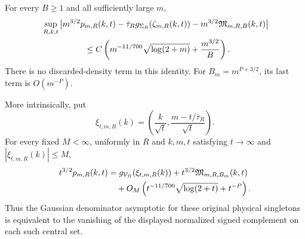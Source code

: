 \begin{theorem}
\label{thm:physical-singleton-reduction}
For every $B\ge1$ and all sufficiently large $m$,
\begin{align}
 &\sup_{R,k,t}\big|m^{3/2}p_{m,R}(k,t)
  -\bar\tau_Rg_{\Sigma_R}(\zeta_{m,R}(k,t))
  -m^{3/2}\mathfrak M_{m,R,B}(k,t)\big|\notag\\
 &\hspace{18mm}\le C\left(m^{-11/700}\sqrt{\log(2+m)}+\frac{m^{3/2}}B\right).
 \label{eq:physical-singleton-local-ledger}
\end{align}
There is no discarded-density term in this identity. For
$B_m=m^{P+3/2}$, its last term is $O(m^{-P})$.

More intrinsically, put
\[
 \xi_{t,m,R}(k)=\left(\frac{k}{\sqrt t},
                              \frac{m-t/\bar\tau_R}{\sqrt t}\right).
\]
For every fixed $M<\infty$, uniformly in $R$ and $k,m,t$ satisfying
$t\to\infty$ and $|\xi_{t,m,R}(k)|\le M$,
\begin{align}
 t^{3/2}p_{m,R}(k,t)
 &=g_{\mathcal V_R}(\xi_{t,m,R}(k))
       +t^{3/2}\mathfrak M_{m,R,B_m}(k,t)\notag\\
 &\quad+O_M\left(t^{-11/700}\sqrt{\log(2+t)}+t^{-P}\right).
 \label{eq:physical-singleton-intrinsic-ledger}
\end{align}
Thus the Gaussian denominator asymptotic for these original physical
singletons is equivalent to the vanishing of the displayed normalized
signed complement on each such central set.
\end{theorem}
